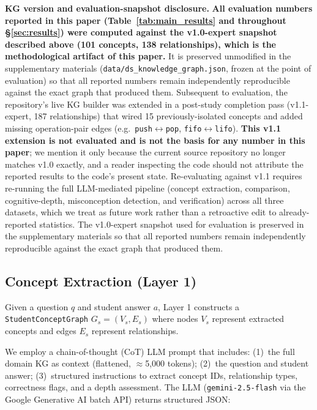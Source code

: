 \documentclass[conference]{IEEEtran}
\begin{document}
\textbf{KG version and evaluation-snapshot disclosure.} \textbf{All
evaluation numbers reported in this paper (Table~\ref{tab:main_results}
and throughout \S\ref{sec:results}) were computed against the v1.0-expert
snapshot described above (101 concepts, 138 relationships), which is the
methodological artifact of this paper.} It is preserved unmodified in the
supplementary materials (\texttt{data/ds\_knowledge\_graph.json}, frozen
at the point of evaluation) so that all reported numbers remain
independently reproducible against the exact graph that produced them.
Subsequent to evaluation, the repository's live KG builder was extended
in a post-study completion pass (v1.1-expert, 187 relationships) that
wired 15 previously-isolated concepts and added missing operation-pair
edges (e.g.\ \texttt{push}$\leftrightarrow$\texttt{pop},
\texttt{fifo}$\leftrightarrow$\texttt{lifo}). \textbf{This v1.1 extension
is not evaluated and is not the basis for any number in this paper}; we
mention it only because the current source repository no longer matches
v1.0 exactly, and a reader inspecting the code should not attribute the
reported results to the code's present state. Re-evaluating against v1.1
requires re-running the full LLM-mediated pipeline (concept extraction,
comparison, cognitive-depth, misconception detection, and verification)
across all three datasets, which we treat as future work rather than a
retroactive edit to already-reported statistics. The v1.0-expert snapshot
used for evaluation is preserved in the supplementary materials so that
all reported numbers remain independently reproducible against the
exact graph that produced them.

\subsection{Concept Extraction (Layer 1)}
\label{subsec:extraction}

Given a question $q$ and student answer $a$, Layer 1 constructs a
\texttt{StudentConceptGraph} $G_s = (V_s, E_s)$ where nodes $V_s$ represent
extracted concepts and edges $E_s$ represent relationships.

We employ a chain-of-thought (CoT) LLM prompt \cite{wei2022cot} that includes: (1)~the full domain
KG as context (flattened, $\approx$5,000 tokens); (2)~the question and student
answer; (3)~structured instructions to extract concept IDs, relationship types,
correctness flags, and a depth assessment. The LLM (\texttt{gemini-2.5-flash}
via the Google Generative AI batch API) returns structured JSON:
\end{document}
